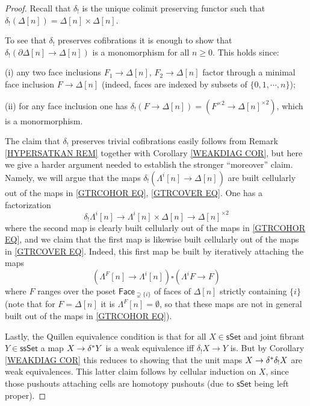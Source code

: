 \documentclass[a4paper,10pt
,draft
]{article}%
\begin{document}
\begin{proof}
	Recall that $\delta_!$ is the unique colimit preserving functor such that 
	$\delta_!(\Delta[n])=\Delta[n] \times \Delta[n]$.

	To see that $\delta_!$ preserves cofibrations 
	it is enough to show that 
	$\delta_{!}\left( \partial \Delta[n] \to \Delta[n]\right)$
	is a monomorphism for all $n\geq 0$.
	This holds since:
\begin{inparaenum}
	\item[(i)] any two face inclusions $F_1 \to \Delta[n]$, $F_2 \to \Delta[n]$ factor through a minimal face inclusion $F \to \Delta[n]$ (indeed, faces are indexed by subsets of $\{0,1,\cdots,n\}$); 
	\item[(ii)] for any face inclusion one has 
		$\delta_{!}\left( F \to \Delta[n]\right) = 
		\left(F^{\times 2} \to \Delta[n]^{\times 2} \right)$, which is a monormorphism.
\end{inparaenum}

The claim that $\delta_!$ preserves trivial cofibrations easily follows from Remark \ref{HYPERSATKAN REM} together with Corollary \ref{WEAKDIAG COR}, but here we give a harder argument needed to establish the stronger ``moreover'' claim.
Namely, we will argue that the maps
$\delta_! \left( \Lambda^i[n] \to \Delta[n]\right)$
are built cellularly out of the maps in 
\eqref{GTRCOHOR EQ}, \eqref{GTRCOVER EQ}.
One has a factorization
\[
	\delta_! \Lambda^i[n] \to
	\Lambda^i[n] \times \Delta[n] \to \Delta[n]^{\times 2}
\]
where the second map is clearly built cellularly out of the maps in 
\eqref{GTRCOHOR EQ}, and we claim that 
the first map is likewise built cellularly out of the maps in \eqref{GTRCOVER EQ}.
Indeed, this first map be built by iteratively attaching the maps
\[
	\left(\Lambda^{F}[n] \to \Lambda^i[n] \right)
		\square
	\left(\Lambda^{i}F \to F \right)
\]
where $F$ ranges over the poset $\mathsf{Face}_{\supsetneq \{i\}}$
of faces of $\Delta[n]$ strictly containing $\{i\}$ 
(note that for $F=\Delta[n]$ it is $\Lambda^F[n]=\emptyset$, so that these maps are not in general built out of the maps in \eqref{GTRCOHOR EQ}). 

Lastly, the Quillen equivalence condition 
is that for all $X \in \mathsf{sSet}$ and joint fibrant
$Y \in \mathsf{ssSet}$ a map
$X \to \delta^{\**} Y$ is a weak equivalence iff 
$\delta_!X \to Y$ is. 
But by Corollary \ref{WEAKDIAG COR}
this reduces to showing
that the unit maps $X \to \delta^{\**} \delta_! X$
are weak equivalences. This latter claim follows by cellular induction on $X$, since those pushouts attaching cells are homotopy pushouts (due to $\mathsf{sSet}$ being left proper).
\end{proof}
\end{document}
